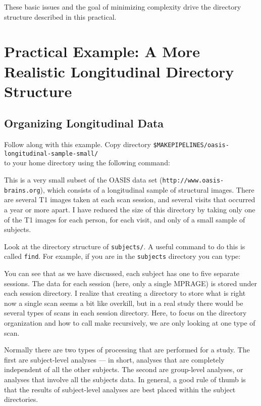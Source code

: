 These basic issues and the goal of minimizing complexity drive the directory structure described in this practical. 


\section{Practical Example: A More Realistic Longitudinal Directory Structure}

\subsection{Organizing Longitudinal Data}

Follow along with this example. Copy directory 
\newline\texttt{\$MAKEPIPELINES/oasis-longitudinal-sample-small/} \\
to your home directory using the following command:

This is a very small subset of the OASIS data set (\texttt{http://www.oasis-brains.org}), which consists of a
longitudinal sample of structural images. There are several T1 images
taken at each scan session, and several visits that occurred a year or
more apart. I have reduced the size of this directory by taking only one of the T1 images
for each person, for each visit, and only of a small sample of
subjects.

Look at the directory structure of \texttt{subjects/}. A useful command to do this is called \texttt{find}. For example, if you are in the \texttt{subjects} directory you can type:

You can see that as we have discussed, each subject has one to five
separate sessions. The data for each session (here, only a single
MPRAGE) is stored under each session directory. I realize that
creating a directory to store what is right now a single scan seems a
bit like overkill, but in a real study there would be several types of
scans in each session directory. Here, to focus on the directory
organization and how to call make recursively, we are only looking at
one type of scan.

Normally there are two types of processing that are performed for a
study. The first are subject-level analyses --- in short, analyses that
are completely independent of all the other subjects. The second are
group-level analyses, or analyses that involve all the subjects
data. In general, a good rule of thumb is that the results of
subject-level analyses are best placed within the subject directories.

